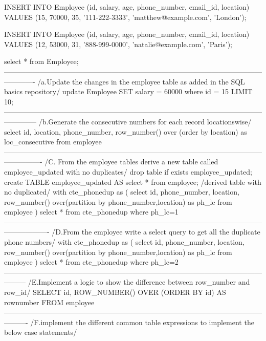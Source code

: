 INSERT INTO Employee (id, salary, age, phone_number, email_id, location)
VALUES (15, 70000, 35, '111-222-3333', 'matthew@example.com', 'London');

INSERT INTO Employee (id, salary, age, phone_number, email_id, location)
VALUES (12, 53000, 31, '888-999-0000', 'natalie@example.com', 'Paris');

select * from Employee;
-------------------------------------------------------------------------------------------------------------------------
/a.Update the changes in the employee table as added in the SQL basics repository/
update Employee SET salary = 60000 where id = 15 LIMIT 10;
--------------------------------------------------------------------------------------------------------------------------
/b.Generate the consecutive numbers for each record locationswise/
select 
id, 
location,
phone_number,
row_number()
over 
(order by location) as loc_consecutive
from 
employee 
----------------------------------------------------------------------------------------------------------------------------
/C. From the employee tables derive a new table called employee_updated with no duplicates/
drop table if exists employee_updated;
create TABLE employee_updated AS 
select * from employee;
/derived table with no duplicated/
with cte_phonedup as
(
select
 id,
 phone_number,
 location,
row_number()
over(partition by phone_number,location) as ph_lc
from employee
)
select * from cte_phonedup where ph_lc=1
-------------------------------------------------------------------------------------------------------------------------------
/D.From the employee write a select query to get all the duplicate phone numbers/
with cte_phonedup as
(
select
 id,
 phone_number,
 location,
row_number()
over(partition by phone_number,location) as ph_lc
from employee
)
select * from cte_phonedup where ph_lc=2
---------------------------------------------------------------------------------------------------------------------
/E.Implement a logic to show the difference between row_number and row_id/
SELECT id, 
ROW_NUMBER() 
OVER (ORDER BY id) AS rownumber
FROM employee
----------------------------------------------------------------------------------------------------------------------
/F.implement the different common table expressions to implement the below case statements/

